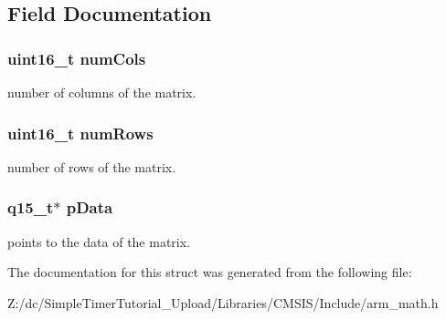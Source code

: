 \subsection{Field Documentation}
\hypertarget{structarm__matrix__instance__q15_a4bb5ec0d13eb4c9cf887aa8366a44117}{
\subsubsection[{num\-Cols}]{\setlength{\rightskip}{0pt plus 5cm}uint16\-\_\-t num\-Cols}}\label{structarm__matrix__instance__q15_a4bb5ec0d13eb4c9cf887aa8366a44117}
number of columns of the matrix. \hypertarget{structarm__matrix__instance__q15_a1bcf80ccdc2acc29198f1592ae300390}{
\subsubsection[{num\-Rows}]{\setlength{\rightskip}{0pt plus 5cm}uint16\-\_\-t num\-Rows}}\label{structarm__matrix__instance__q15_a1bcf80ccdc2acc29198f1592ae300390}
number of rows of the matrix. \hypertarget{structarm__matrix__instance__q15_a817ede38365e63e561a12069c6c5c087}{
\subsubsection[{p\-Data}]{\setlength{\rightskip}{0pt plus 5cm}q15\-\_\-t$\ast$ p\-Data}}\label{structarm__matrix__instance__q15_a817ede38365e63e561a12069c6c5c087}
points to the data of the matrix. 

The documentation for this struct was generated from the following file\-:\begin{DoxyCompactItemize}
\item 
Z\-:/dc/\-Simple\-Timer\-Tutorial\-\_\-\-Upload/\-Libraries/\-C\-M\-S\-I\-S/\-Include/arm\-\_\-math.\-h\end{DoxyCompactItemize}
